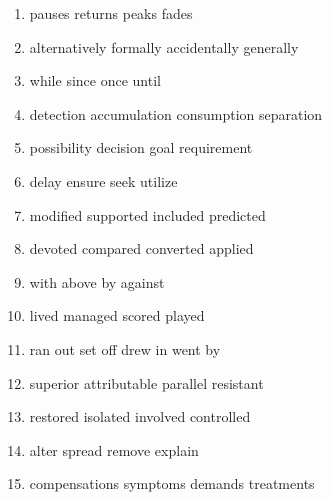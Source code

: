 \begin{enumerate}
	\item
\fourchoices
{pauses}
{returns}
{peaks}
{fades}

	

\item 			
\fourchoices
{alternatively}
{formally}
{accidentally}
{generally}


			
\item
			
\fourchoices
{while}
{since}
{once}
{until}

	
\item 
\fourchoices
{detection}
{accumulation}
{consumption}
{separation}


\item
			
\fourchoices
{possibility}
{decision}
{goal}
{requirement}

	
\item 
\fourchoices
{delay}
{ensure}
{seek}
{utilize}

	
\item 
\fourchoices
{modified}
{supported}
{included}
{predicted}

	
\item 
\fourchoices
{devoted}
{compared}
{converted}
{applied}

	
\item 
\fourchoices
{with}
{above}
{by}
{against}

	
\item 
\fourchoices
{lived}
{managed}
{scored}
{played}

	
\item 
\fourchoices
{ran out}
{set off}
{drew in}
{went by}

	
\item 
\fourchoices
{superior}
{attributable}
{parallel}
{resistant}

	
\item 
\fourchoices
{restored}
{isolated}
{involved}
{controlled}

	
\item 
\fourchoices
{alter}
{spread}
{remove}
{explain}

	
\item 
\fourchoices
{compensations}
{symptoms}
{demands}
{treatments}


\end{enumerate}
